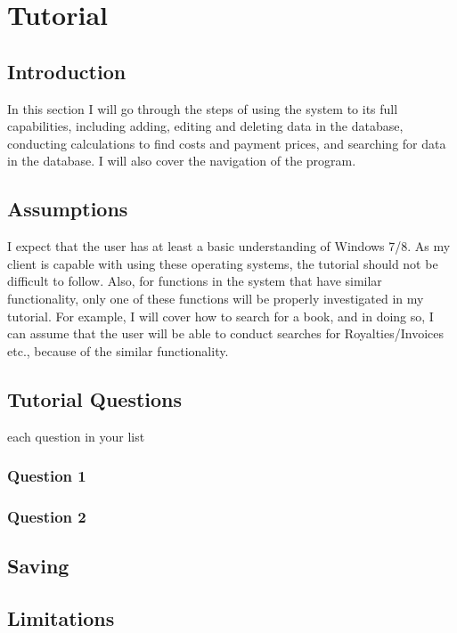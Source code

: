 \section{Tutorial}

\subsection{Introduction}

In this section I will go through the steps of using the system to its full capabilities, including adding, editing and deleting data in the database, conducting calculations to find costs and payment prices, and searching for data in the database. I will also cover the navigation of the program.

\subsection{Assumptions}

I expect that the user has at least a basic understanding of Windows 7/8. As my client is capable with using these operating systems, the tutorial should not be difficult to follow. Also, for functions in the system that have similar functionality, only one of these functions will be properly investigated in my tutorial. For example, I will cover how to search for a book, and in doing so, I can assume that the user will be able to conduct searches for Royalties/Invoices etc., because of the similar functionality.

\subsection{Tutorial Questions}

 each question in your list
\subsubsection{Question 1}

\subsubsection{Question 2}

\subsection{Saving}

\subsection{Limitations}

